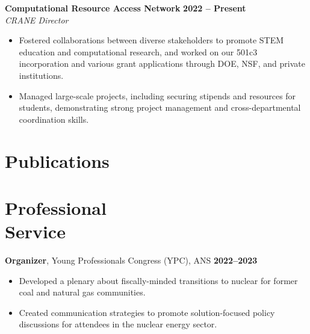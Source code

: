 \documentclass[margin,line]{resume}
\begin{document}
\begin{resume}
    \textbf{Computational Resource Access Network} \hfill \textbf{2022 -- Present} \\
    \textsl{CRANE Director} \\
    \begin{itemize}
        \item Fostered collaborations between diverse stakeholders to promote STEM education and computational research, and worked on our 501c3 incorporation and various grant applications through DOE, NSF, and private institutions.
        \item Managed large-scale projects, including securing stipends and resources for students, demonstrating strong project management and cross-departmental coordination skills.
    \end{itemize}
    \vspace{-4mm}
    \section{\mysidestyle Publications}

    \begin{bibenum}
        \item {}
        \item {}
        \item {}
        \item {}
    \end{bibenum}

    \section{\mysidestyle Professional\\Service}

    \textbf{Organizer}, Young Professionals Congress (YPC), ANS \hfill \textbf{2022--2023}\vspace{.5mm}\\%
    \begin{itemize}
        \item Developed a plenary about fiscally-minded transitions to nuclear for former coal and natural gas communities.
        \item Created communication strategies to promote solution-focused policy discussions for attendees in the nuclear energy sector.
    \end{itemize}


\end{resume}
\end{document}
